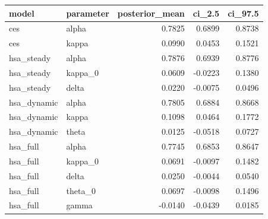 \begin{tabular}{llrrr}
\toprule
model & parameter & posterior\_mean & ci\_2.5 & ci\_97.5 \\
\midrule
ces & alpha & 0.7825 & 0.6899 & 0.8738 \\
ces & kappa & 0.0990 & 0.0453 & 0.1521 \\
hsa\_steady & alpha & 0.7876 & 0.6939 & 0.8776 \\
hsa\_steady & kappa\_0 & 0.0609 & -0.0223 & 0.1380 \\
hsa\_steady & delta & 0.0220 & -0.0075 & 0.0496 \\
hsa\_dynamic & alpha & 0.7805 & 0.6884 & 0.8668 \\
hsa\_dynamic & kappa & 0.1098 & 0.0464 & 0.1772 \\
hsa\_dynamic & theta & 0.0125 & -0.0518 & 0.0727 \\
hsa\_full & alpha & 0.7745 & 0.6853 & 0.8647 \\
hsa\_full & kappa\_0 & 0.0691 & -0.0097 & 0.1482 \\
hsa\_full & delta & 0.0250 & -0.0044 & 0.0540 \\
hsa\_full & theta\_0 & 0.0697 & -0.0098 & 0.1496 \\
hsa\_full & gamma & -0.0140 & -0.0439 & 0.0185 \\
\bottomrule
\end{tabular}
